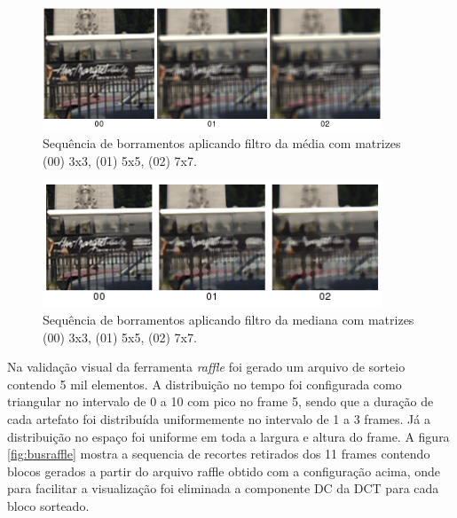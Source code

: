 \begin{figure}[!htb]
	\centering
	\includegraphics[width=0.9\textwidth]{./imgs/bluraverage.png}
	\caption[Sequência de borramentos aplicando filtro da média]{Sequência de borramentos aplicando filtro da média com matrizes (00) 3x3, (01) 5x5, (02) 7x7.}
	\label{fig:bluraverage}
\end{figure}

\begin{figure}[!htb]
	\centering
	\includegraphics[width=0.9\textwidth]{./imgs/blurmedian.png}
	\caption[Sequência de borramentos aplicando filtro da mediana]{Sequência de borramentos aplicando filtro da mediana com matrizes (00) 3x3, (01) 5x5, (02) 7x7.}
	\label{fig:blurmedian}
\end{figure}

Na validação visual da ferramenta \emph{raffle} foi gerado um arquivo de sorteio contendo 5 mil elementos.
A distribuição no tempo foi configurada como triangular no intervalo de 0 a 10 com pico no frame 5, sendo que a duração de cada artefato foi distribuída uniformemente no intervalo de 1 a 3 frames.
Já a distribuição no espaço foi uniforme em toda a largura e altura do frame. 
A figura \ref{fig:busraffle} mostra a sequencia de recortes retirados dos 11 frames contendo blocos gerados a partir do arquivo raffle obtido com a configuração acima, onde para facilitar a visualização foi eliminada a componente DC da DCT para cada bloco sorteado.

